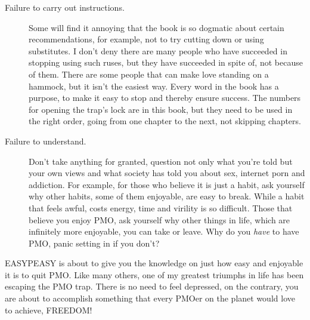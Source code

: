 \documentclass[easypeasy.tex]{subfiles}
\begin{document}
\begin{description}
  \item [Failure to carry out instructions.] Some will find it annoying that the book is so dogmatic about certain recommendations, for example, not to try cutting down or using substitutes. I don't deny there are many people who have succeeded in stopping using such ruses, but they have succeeded in spite of, not because of them. There are some people that can make love standing on a hammock, but it isn't the easiest way. Every word in the book has a purpose, to make it easy to stop and thereby ensure success. The numbers for opening the trap's lock are in this book, but they need to be used in the right order, going from one chapter to the next, not skipping chapters.

  \item [Failure to understand.] Don't take anything for granted, question not only what you're told but your own views and what society has told you about sex, internet porn and addiction. For example, for those who believe it is just a habit, ask yourself why other habits, some of them enjoyable, are easy to break. While a habit that feels awful, costs energy, time and virility is so difficult. Those that believe you enjoy PMO, ask yourself why other things in life, which are infinitely more enjoyable, you can take or leave. Why do you \textit{have} to have PMO, panic setting in if you don't?
\end{description}

EASYPEASY is about to give you the knowledge on just how easy and enjoyable it is to quit PMO. Like many others, one of my greatest triumphs in life has been escaping the PMO trap. There is no need to feel depressed, on the contrary, you are about to accomplish something that every PMOer on the planet would love to achieve, FREEDOM!
\end{document}
